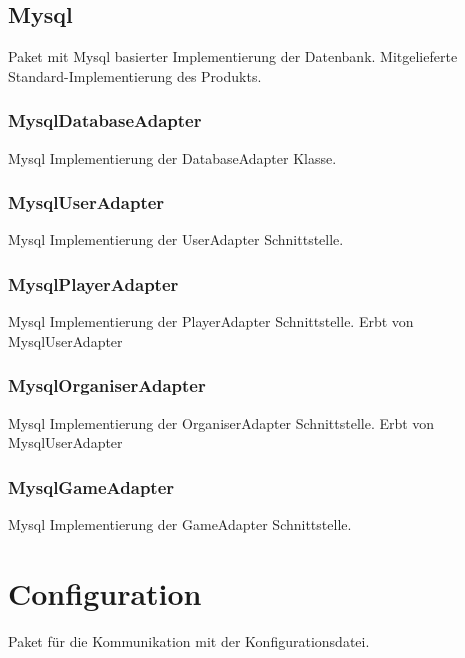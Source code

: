 \documentclass[a4paper]{scrreprt}
\begin{document}
    \subsection{Mysql}
    Paket mit Mysql basierter Implementierung der Datenbank.
    Mitgelieferte Standard-Implementierung des Produkts.

    \subsubsection{MysqlDatabaseAdapter}
    Mysql Implementierung der DatabaseAdapter Klasse.

    \subsubsection{MysqlUserAdapter}
    Mysql Implementierung der UserAdapter Schnittstelle.

    \subsubsection{MysqlPlayerAdapter}
    Mysql Implementierung der PlayerAdapter Schnittstelle.
    Erbt von MysqlUserAdapter

    \subsubsection{MysqlOrganiserAdapter}
    Mysql Implementierung der OrganiserAdapter Schnittstelle.
    Erbt von MysqlUserAdapter

    \subsubsection{MysqlGameAdapter}
    Mysql Implementierung der GameAdapter Schnittstelle.

    \section{Configuration}
    Paket für die Kommunikation mit der Konfigurationsdatei.
\end{document}
